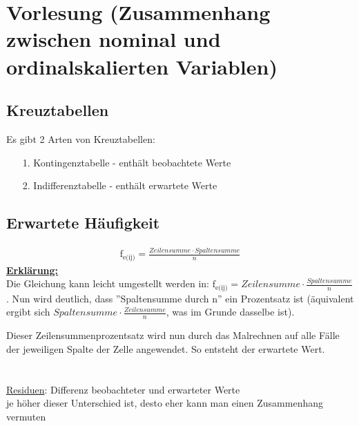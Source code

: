 \section{Vorlesung (Zusammenhang zwischen nominal und ordinalskalierten Variablen)}

\subsection{Kreuztabellen}
Es gibt 2 Arten von Kreuztabellen:
\begin{itemize}
  \item [1.] Kontingenztabelle - enthält beobachtete Werte
  \item [2.] Indifferenztabelle - enthält erwartete Werte
\end{itemize}

\subsection{Erwartete Häufigkeit}
\begin{align*}
  \textrm{f}_\textrm{e(ij)} = \frac{Zeilensumme \cdot Spaltensumme}{n}
\end{align*}
\underline{\textbf{Erklärung:}}\\
Die Gleichung kann leicht umgestellt werden in: $\textrm{f}_\textrm{e(ij)} = Zeilensumme \cdot \frac{Spaltensumme}{n}
$. Nun wird deutlich, dass ''Spaltensumme durch n'' ein Prozentsatz ist (äquivalent ergibt sich $Spaltensumme \cdot \frac{Zeilensumme}{n}$, was im Grunde dasselbe ist).

Dieser Zeilensummenprozentsatz wird nun durch das Malrechnen auf alle Fälle der jeweiligen Spalte der Zelle angewendet. So entsteht der erwartete Wert.\\
\\\\
\underline{Residuen}: Differenz beobachteter und erwarteter Werte\\ je höher dieser Unterschied ist, desto eher kann man einen Zusammenhang vermuten


